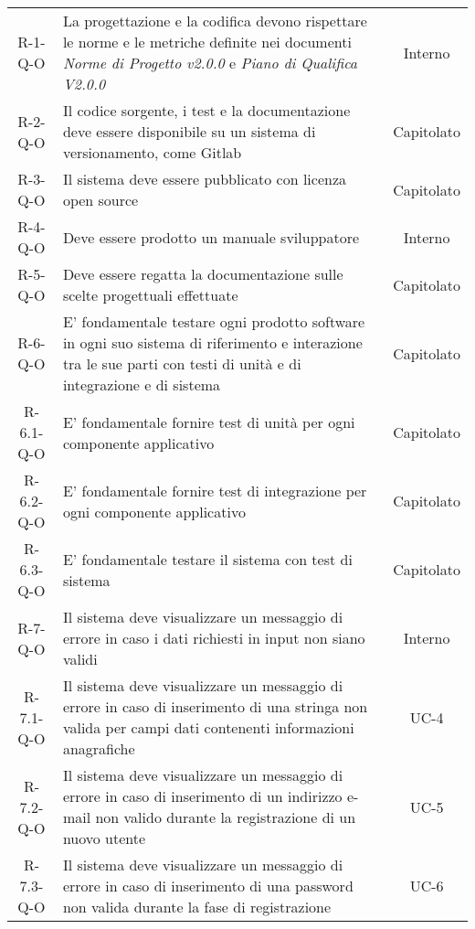\begin{longtable}{ c C{9cm} c }
    R-1-Q-O     & La progettazione e la codifica devono rispettare le norme e le metriche definite nei documenti \emph{Norme di Progetto v2.0.0} e \emph{Piano di Qualifica V2.0.0} & Interno\\
    R-2-Q-O     & Il codice sorgente, i test e la documentazione deve essere disponibile su un sistema di versionamento, come Gitlab & Capitolato\\
    R-3-Q-O     & Il sistema deve essere pubblicato con licenza open source & Capitolato\\
    R-4-Q-O     & Deve essere prodotto un manuale sviluppatore & Interno \\
    R-5-Q-O     & Deve essere regatta la documentazione sulle scelte progettuali effettuate & Capitolato \\
    R-6-Q-O     & E' fondamentale testare ogni prodotto software in ogni suo sistema di riferimento e interazione tra le sue parti con testi di unità e di integrazione e di sistema & Capitolato\\
    R-6.1-Q-O   & E' fondamentale fornire test di unità per ogni componente applicativo & Capitolato \\
    R-6.2-Q-O   & E' fondamentale fornire test di integrazione per ogni componente applicativo & Capitolato \\
    R-6.3-Q-O   & E' fondamentale testare il sistema con test di sistema & Capitolato \\
    R-7-Q-O     & Il sistema deve visualizzare un messaggio di errore in caso i dati richiesti in input non siano validi & Interno \\
    R-7.1-Q-O   & Il sistema deve visualizzare un messaggio di errore in caso di inserimento di una stringa non valida per campi dati contenenti informazioni anagrafiche & UC-4 \\
    R-7.2-Q-O   & Il sistema deve visualizzare un messaggio di errore in caso di inserimento di un indirizzo e-mail non valido durante la registrazione di un nuovo utente & UC-5 \\
    R-7.3-Q-O   & Il sistema deve visualizzare un messaggio di errore in caso di inserimento di una password non valida durante la fase di registrazione & UC-6 \\




\end{longtable}